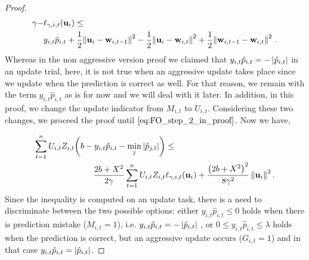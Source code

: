 {\begin{proof}
\begin{align*}
\gamma-&\ell_{\gamma,i,t}(\mathbf{u}_i)\le \\
&y_{i,t}\hat{p}_{i,t}+\frac{1}{2}{\left\Vert {\mathbf{u}_{i}-\mathbf{w}_{i,t-1}} \right\Vert^2}
        -\frac{1}{2}{\left\Vert {\mathbf{u}_i-\mathbf{w}_{i,t}} \right\Vert^2}+\frac{1}{2}{\left\Vert {\mathbf{w}_{i,t-1}-\mathbf{w}_{i,t}} \right\Vert^2}~.
\end{align*}
Whereas in the non aggressive version proof we claimed that $y_{i,t}\hat{p}_{i,t}=-\left\vert{\hat{p}_{i,t}}\right\vert$ in an 
update trial, here, it is not true when an aggressive update takes place since we update when the prediction 
is correct as well. For that reason, we  remain with the term $y_{i,t}\hat{p}_{i,t}$ as is for now and we will 
deal with it later. In addition, in this proof,  we change the update indicator from $M_{i,t}$ to $U_{i,t}$. 
Considering these two changes, we proceed the proof until $\eqref{eq:FO_step_2_in_proof}$. Now we have,

\begin{equation}
\begin{split}
\sum_{t=1}^{n}U_{i,t}Z_{i,t}{\left({b -y_{i,t}\hat{p}_{i,t}-\min_j{\left\vert{\hat{p}_{j,t}}\right\vert}}\right)}&\le\\
\frac{2b+X^2}{2\gamma}\sum_{t=1}^{n}U_{i,t}Z_{i,t}&\ell_{\gamma,i,t}(\mathbf{u}_i)+\frac{\left({2b+X^2}\right)^2}{8{\gamma}^2}\left\Vert {\mathbf{u}_i} \right\Vert^2.
\label{eq:step_3_in_proof_agressive}
\end{split}
\end{equation}
 Since the inequality is computed on an update task, there is a need to discriminate between   the two possible options: either 
$y_{i,t}\hat{p}_{i,t}\le0$ holds  when there is prediction mistake ($M_{i,t}=1$), i.e. $y_{i,t}\hat{p}_{i,t}=-\left\vert{\hat{p}_{i,t}}\right\vert$  ,  or $0\le y_{i,t}\hat{p}_{i,t}\le\lambda$ holds  when the prediction is correct,  but an aggressive update occurs ($G_{i,t}=1$) and  in that case  $y_{i,t}\hat{p}_{i,t}=\left\vert{\hat{p}_{i,t}}\right\vert$.


\end{proof}}
